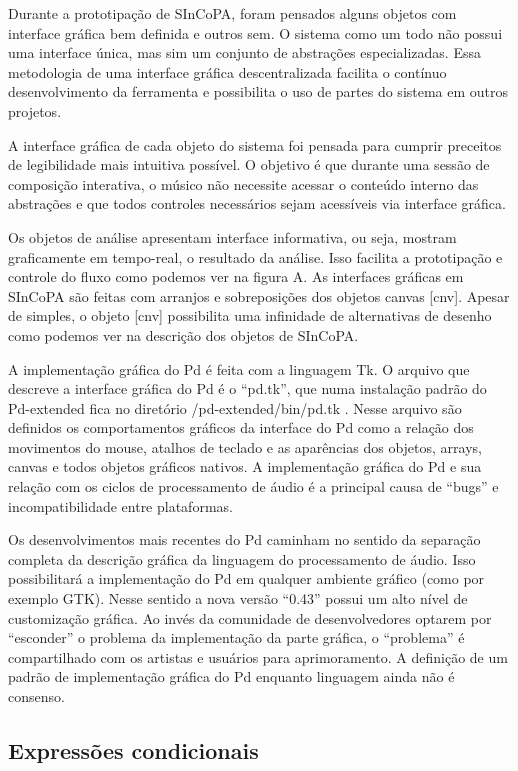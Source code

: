 \documentclass[draft]{ppgmus}
\begin{document}
Durante a prototipação de SInCoPA, foram pensados
alguns objetos com interface gráfica bem definida e outros
sem. O sistema como um todo não possui uma interface única, mas
sim um conjunto de abstrações especializadas. Essa metodologia
de uma interface gráfica descentralizada facilita o contínuo
desenvolvimento da ferramenta e possibilita o uso de partes do
sistema em outros projetos.

A interface gráfica de cada objeto do sistema foi pensada para cumprir
preceitos de legibilidade mais intuitiva possível. O
objetivo é que durante uma sessão de composição interativa, o
músico não necessite acessar o conteúdo interno das abstrações e 
que todos controles necessários sejam acessíveis via interface gráfica. 

Os objetos de análise apresentam interface informativa, ou seja, 
mostram graficamente em tempo-real, o resultado da análise. Isso facilita
a prototipação e controle do fluxo como podemos ver  na figura A.
As interfaces gráficas em SInCoPA são feitas com arranjos e sobreposições
dos objetos canvas [cnv]. Apesar de simples, o objeto [cnv] possibilita
uma infinidade de alternativas de desenho como podemos ver na descrição
dos objetos de SInCoPA.

A implementação gráfica do Pd é feita com a linguagem Tk. O arquivo
que descreve a interface gráfica do Pd é o ``pd.tk'', que numa instalação
padrão do Pd-extended fica no diretório /pd-extended/bin/pd.tk .
Nesse arquivo são definidos os comportamentos gráficos da interface do Pd como
a relação dos movimentos do mouse, atalhos de teclado e as aparências dos
objetos, arrays, canvas e todos objetos gráficos nativos.
A implementação gráfica do Pd e sua relação com os ciclos de processamento
de áudio é a principal causa de ``bugs'' e incompatibilidade entre plataformas.

Os desenvolvimentos mais recentes do Pd caminham no sentido da separação
completa da descrição gráfica da linguagem do processamento de áudio. 
Isso possibilitará a implementação do Pd em qualquer ambiente gráfico (como
por exemplo GTK).
Nesse sentido a nova versão ``0.43'' possui um alto nível de customização gráfica.
Ao invés da comunidade de desenvolvedores optarem por ``esconder'' o problema
da implementação da parte gráfica, o ``problema'' é compartilhado com os
artistas e usuários para aprimoramento. A definição de um padrão de implementação
gráfica do Pd enquanto linguagem ainda não é consenso.

\subsection{Expressões condicionais}
\end{document}
